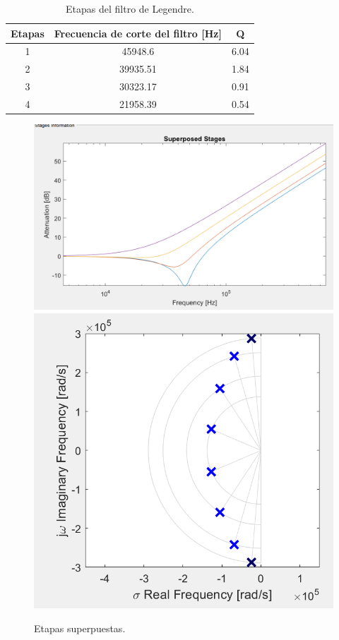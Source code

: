 \documentclass[../../ASSD_TP1_G7.tex]{subfiles}
\begin{document}
\begin{table}[H]
\begin{centering}
\begin{tabular}{|c|c|c|}
\hline 
Etapas & Frecuencia de corte del filtro {[}Hz{]} & Q\\
\hline 
\hline 
1 & 45948.6 & 6.04\\
\hline 
2 & 39935.51 & 1.84\\
\hline 
3 & 30323.17 & 0.91\\
\hline 
4 & 21958.39 & 0.54\\
\hline 
\end{tabular}\caption{Etapas del filtro de Legendre.\label{tab:Etapas-del-filtro}}
\par\end{centering}
\end{table}


\begin{figure}[H]
\begin{centering}
\includegraphics[scale=0.6]{Imagenes/etapas_superpuestas.PNG}\includegraphics[scale=0.71]{Imagenes/poles_constelation.PNG}\caption{Etapas superpuestas.}
\par\end{centering}
\end{figure}
\end{document}
